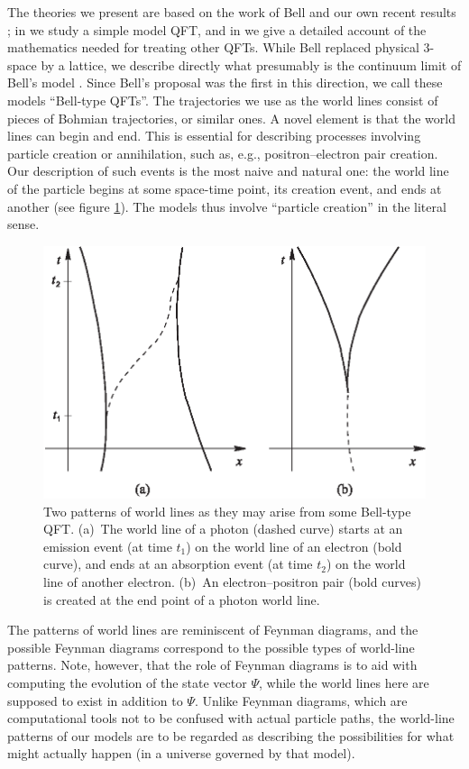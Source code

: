 \documentclass[12pt, showpacs, nofootinbib,superscriptaddress]{revtex4-2}%
\begin{document}
The theories we present are based on the work of Bell
\cite{BellBeables} and our own recent results
\cite{crea1,crea2a,crea2b}; in \cite{crea1} we study a simple model
QFT, and in \cite{crea2a,crea2b} we give a detailed account of the
mathematics needed for treating other QFTs.  While Bell replaced
physical 3-space by a lattice, we describe directly what presumably is
the continuum limit of Bell's model \cite{crea2a,crea2b,Sudbery,Vink}.
Since Bell's proposal was the first in this direction, we call these
models ``Bell-type QFTs''.  The trajectories we use as the world lines
consist of pieces of Bohmian trajectories, or similar ones.  A novel
element is that the world lines can begin and end.  This is essential
for describing processes involving particle creation or annihilation,
such as, e.g., positron--electron pair creation.  Our description of
such events is the most naive and natural one: the world line of the
particle begins at some space-time point, its creation event, and ends
at another (see figure \ref{figone}).  The models thus involve
``particle creation'' in the literal sense.

\begin{figure}[h]
\begin{center}
\includegraphics[width=.7\linewidth]{crletf1neu.eps}
\end{center}
\caption{Two patterns of world lines as they may arise from some
   Bell-type QFT. (a)~The world line of a photon (dashed curve) starts
   at an emission event (at time $t_1$) on the world line of an
   electron (bold curve), and ends at an absorption event (at time
   $t_2$) on the world line of another electron. (b)~An
   electron--positron pair (bold curves) is created at the end point of
   a photon world line.}
\label{figone}
\end{figure}

The patterns of world lines are reminiscent of Feynman diagrams, and
the possible Feynman diagrams correspond to the possible types of
world-line patterns.  Note, however, that the role of Feynman diagrams
is to aid with computing the evolution of the state vector $\Psi$,
while the world lines here are supposed to exist in addition to
$\Psi$.  Unlike Feynman diagrams, which are computational tools not to
be confused with actual particle paths, the world-line patterns of our
models are to be regarded as describing the possibilities for what
might actually happen (in a universe governed by that model).
\end{document}
